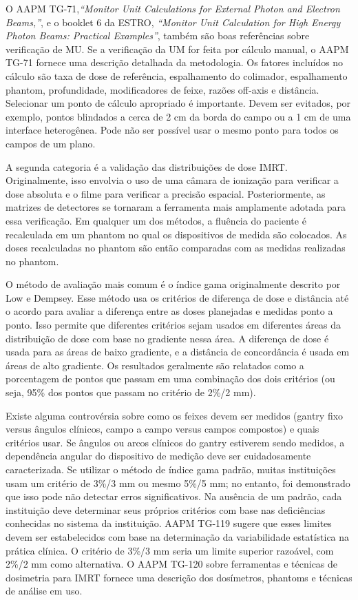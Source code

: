 \documentclass[11pt,a4paper]{article}
\newcounter{exemplo}
\begin{document}
	O AAPM TG-71,\textit{``Monitor Unit Calculations for External Photon and Electron Beams,''}, e o booklet 6 da ESTRO, \textit{``Monitor Unit Calculation for High Energy Photon Beams: Practical Examples''}, também são boas referências sobre verificação de MU. Se a verificação da UM for feita por cálculo manual, o AAPM TG-71 fornece uma descrição detalhada da metodologia. Os fatores incluídos no cálculo são taxa de dose de referência, espalhamento do colimador, espalhamento phantom, profundidade, modificadores de feixe, razões off-axis e distância. Selecionar um ponto de cálculo apropriado é importante. Devem ser evitados, por exemplo, pontos blindados a cerca de 2 cm da borda do campo ou a 1 cm de uma interface heterogênea. Pode não ser possível usar o mesmo ponto para todos os campos de um plano.

	A segunda categoria é a validação das distribuições de dose IMRT. Originalmente, isso envolvia o uso de uma câmara de ionização para verificar a dose absoluta e o filme para verificar a precisão espacial. Posteriormente, as matrizes de detectores se tornaram a ferramenta mais amplamente adotada para essa verificação. Em qualquer um dos métodos, a fluência do paciente é recalculada em um phantom no qual os dispositivos de medida são colocados. As doses recalculadas no phantom são então comparadas com as medidas realizadas no phantom.

	O método de avaliação mais comum é o índice gama originalmente descrito por Low e Dempsey. Esse método usa os critérios de diferença de dose e distância até o acordo para avaliar a diferença entre as doses planejadas e medidas ponto a ponto. Isso permite que diferentes critérios sejam usados em diferentes áreas da distribuição de dose com base no gradiente nessa área. A diferença de dose é usada para as áreas de baixo gradiente, e a distância de  concordância é usada em áreas de alto gradiente. Os resultados geralmente são relatados como a porcentagem de pontos que passam em uma combinação dos dois critérios (ou seja, 95\% dos pontos que passam no critério de 2\%/2 mm). 
	
	Existe alguma controvérsia sobre como os feixes devem ser medidos (gantry fixo versus ângulos clínicos, campo a campo versus campos compostos) e quais critérios usar. Se ângulos ou arcos clínicos do gantry estiverem sendo medidos, a dependência angular do dispositivo de medição deve ser cuidadosamente caracterizada. Se utilizar o método de índice gama padrão, muitas instituições usam um critério de 3\%/3 mm ou mesmo 5\%/5 mm; no entanto, foi demonstrado que isso pode não detectar erros significativos. Na ausência de um padrão, cada instituição deve determinar seus próprios critérios com base nas deficiências conhecidas no sistema da instituição. AAPM TG-119 sugere que esses limites devem ser estabelecidos com base na determinação da variabilidade estatística na prática clínica. O critério de 3\%/3 mm seria um limite superior razoável, com 2\%/2 mm como alternativa. O AAPM TG-120 sobre ferramentas e técnicas de dosimetria para IMRT fornece uma descrição dos dosímetros, phantoms e técnicas de análise em uso. 
	
\end{document}

